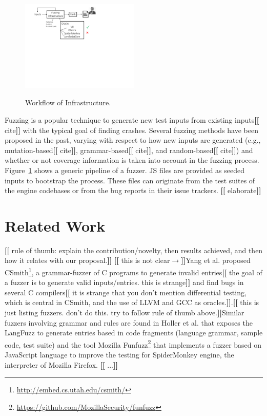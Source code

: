 \documentclass[11pt]{article}
\newcommand{\eg}{e.g.}
\newcommand{\Fix}[1]{\textbf{[[}{\color{red} #1}\textbf{]]}}
\newcommand{\Mar}[1]{\textbf{[[}{\color{blue} #1}\textbf{]]}}
\begin{document}
\begin{figure}
\vspace{-5ex}
  \centering
  \includegraphics[trim=0 350 200 0,clip,width=0.5\textwidth]{google-awards-workflow}
  \label{fig:workflow}
  \caption{Workflow of Infrastructure.}
\end{figure}
Fuzzing is a popular technique to generate new test inputs from
existing inputs\Fix{cite} with the typical goal of finding
crashes. Several fuzzing methods have been proposed in the past,
varying with respect to how new inputs are generated (\eg{},
mutation-based\Fix{cite}, grammar-based\Fix{cite}, and
random-based\Fix{cite}) and whether or not coverage information is
taken into account in the fuzzing process. Figure~\ref{fig:workflow}
shows a generic pipeline of a fuzzer. JS files are provided as seeded
inputs to bootstrap the process. These files can originate from the
test suites of the engine codebases or from the bug reports in their
issue trackers. \Fix{elaborate}

\section{Related Work}

\Mar{rule of thumb: explain the
  contribution/novelty, then results achieved, and then how it relates
with our proposal.}
\Mar{this is not clear$\rightarrow$}Yang et al. \cite{yang-2011-finding} proposed CSmith\footnote{\url{http://embed.cs.utah.edu/csmith/}}, a grammar-fuzzer 
of C programs to generate invalid entries\Fix{the goal of a
  fuzzer is to generate valid inputs/entries. this is strange} and
find bugs in several C compilers\Fix{it is strange that you don't mention differential
  testing, which is central in CSmith, and the use of LLVM and GCC as
  oracles.}.\Mar{this is just listing fuzzers. don't do this. try to
  follow rule of thumb above.}Similar fuzzers involving grammar and rules are found in Holler et al. \cite{holler-2012-fuzzing} 
that exposes the LangFuzz to generate entries based in code fragments 
(language grammar, sample code, test suite) and the tool Mozilla 
Funfuzz\footnote{\url{https://github.com/MozillaSecurity/funfuzz}}
that implements a fuzzer based on JavaScript language to improve the 
testing for SpiderMonkey engine, the interpreter of Mozilla Firefox.
\Fix{...}
\end{document}
